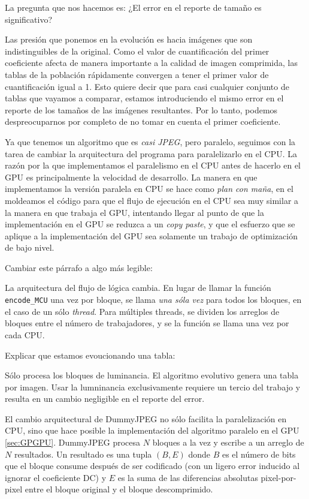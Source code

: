 La pregunta que nos hacemos es: ¿El error en el reporte de tamaño es significativo?

Las presión que ponemos en la evolución es hacia imágenes que son
indistinguibles de la original. Como el valor de cuantificación del primer
coeficiente afecta de manera importante a la calidad de imagen comprimida, las
tablas de la población rápidamente convergen a tener el primer valor de
cuantificación igual a 1. Esto quiere decir que para casi cualquier conjunto de
tablas que vayamos a comparar, estamos introduciendo el mismo error en el
reporte de los tamaños de las imágenes resultantes. Por lo tanto, podemos
despreocuparnos por completo de no tomar en cuenta el primer coeficiente.

Ya que tenemos un algoritmo que es \emph{casi JPEG}, pero paralelo, seguimos con la tarea de cambiar la arquitectura del programa para paralelizarlo en el CPU. La razón por la que implementamos el paralelismo en el CPU antes de hacerlo en el GPU es principalmente la velocidad de desarrollo. La manera en que implementamos la versión paralela en CPU se hace como \emph{plan con maña}, en el moldeamos el código para que el flujo de ejecución en el CPU sea muy similar a la manera en que trabaja el GPU, intentando llegar al punto de que la implementación en el GPU se reduzca a un \emph{copy paste}, y que el esfuerzo que se aplique a la implementación del GPU sea solamente un trabajo de optimización de bajo nivel.

Cambiar este párrafo a algo más legible:

    La arquitectura del flujo de lógica cambia. En lugar de llamar la
        función \verb+encode_MCU+ una vez por bloque, se llama \emph{una sóla
    vez} para todos los bloques, en el caso de un sólo \emph{thread}. Para
múltiples threads, se dividen los arreglos de bloques entre el número de
trabajadores, y se la función se llama una vez por cada CPU.

Explicar que estamos evoucionando una tabla:

    Sólo procesa los bloques de luminancia. El algoritmo evolutivo genera
        una tabla por imagen. Usar la lumninancia exclusivamente requiere un
    tercio del trabajo y resulta en un cambio negligible en el reporte del
error.

El cambio arquitectural de DummyJPEG no sólo facilita la paralelización en CPU,
sino que hace posible la implementación del algoritmo paralelo en el GPU \ref{sec:GPGPU}. DummyJPEG procesa $N$ bloques a la vez y escribe a un arreglo de $N$ resultados. Un resultado es una tupla $(B, E)$ donde $B$ es el número de bits que el bloque consume después de ser codificado (con un ligero error inducido al ignorar el coeficiente DC) y $E$ es la suma de las diferencias absolutas pixel-por-pixel entre el bloque original y el bloque descomprimido.

